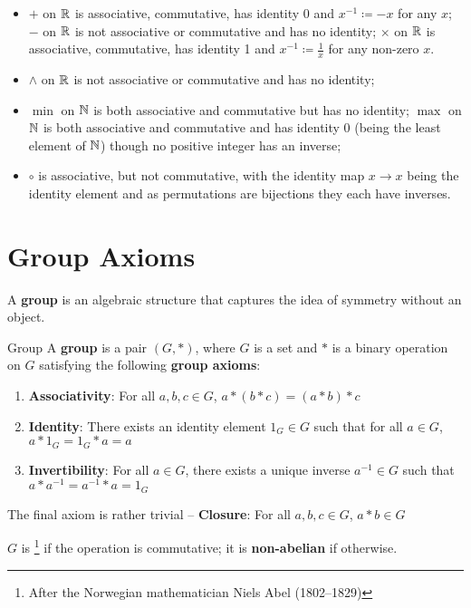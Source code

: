 \begin{exmp}{}{}
\begin{itemize}
\item $+$ on $\mathbb R$ is associative, commutative, has identity 0 and $x^{-1} \coloneqq -x$ for any $x$; $-$ on $\mathbb R$ is not associative or commutative and has no identity; $\times$ on $\mathbb R$ is associative, commutative, has identity 1 and $x^{-1} \coloneqq \frac{1}{x}$ for any non-zero $x$.
\item $\wedge$ on $\mathbb R$ is not associative or commutative and has no identity;
\item $\min$ on $\mathbb N$ is both associative and commutative but has no identity; $\max$ on $\mathbb N$ is both associative and commutative and has identity 0 (being the least element of $\mathbb N$) though no positive integer has an inverse;
\item $\circ$ is associative, but not commutative, with the identity map $x \to x$ being the identity element and as permutations are bijections they each have inverses.
\end{itemize}
\end{exmp}
\pagebreak

\section{Group Axioms}
A \textbf{group} is an algebraic structure that captures the idea of symmetry without an object.

\begin{defn}{Group}{}
A \textbf{group} is a pair $(G,\ast)$, where $G$ is a set and $\ast$ is a binary operation on $G$ satisfying the following \textbf{group axioms}:
\begin{enumerate}[label=G\arabic*]
\item \label{g1_assoc} \textbf{Associativity}: For all $a,b,c \in G$, $a \ast (b \ast c)=(a \ast b) \ast c$
\item \label{g2_id} \textbf{Identity}: There exists an identity element $1_G \in G$ such that for all $a\in G$, $a \ast 1_G = 1_G \ast a = a$
\item \label{g3_inver} \textbf{Invertibility}: For all $a \in G$, there exists a unique inverse $a^{-1} \in G$ such that $a \ast a^{-1} = a^{-1} \ast a = 1_G$
\end{enumerate}
The final axiom is rather trivial -- \textbf{Closure}: For all $a,b,c \in G$, $a\ast b\in G$
\end{defn}

$G$ is \footnote{After the Norwegian mathematician Niels Abel (1802--1829)} if the operation is commutative; it is \textbf{non-abelian} if otherwise.

